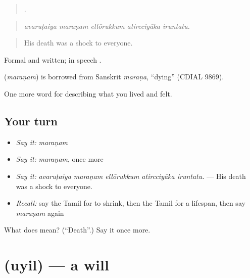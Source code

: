 \begin{quote}
    .
\end{quote}

\begin{quote}
\emph{avaruṭaiya maraṇam ellōrukkum atircciyāka iruntatu.}
\end{quote}

\begin{quote}
His death was a shock to everyone.
\end{quote}

Formal and written; in speech .

\begin{cousinweb}
\textbf{} (\emph{maraṇam}) is borrowed from Sanskrit \emph{maraṇa}, \textquotedblleft{}dying\textquotedblright{} (CDIAL 9869).
\end{cousinweb}

\begin{grammarlens}[title={What you've built}]
One more word for describing what you lived and felt.
\end{grammarlens}

\subsection*{Your turn}
\begin{itemize}
\raggedright
  \item \emph{Say it:} \emph{maraṇam}
  \item \emph{Say it:} \emph{maraṇam}, once more
  \item \emph{Say it:} \emph{avaruṭaiya maraṇam ellōrukkum atircciyāka iruntatu.} — His death was a shock to everyone.
  \item \emph{Recall:} say the Tamil for to shrink, then the Tamil for a lifespan, then say \emph{maraṇam} again
\end{itemize}

\begin{tcolorbox}[breakable,colback=teal!4,colframe=teal!35!black,title={Before you move on}]
What does  mean? (\textquotedblleft{}Death\textquotedblright{}.) Say it once more.
\end{tcolorbox}
\section[\texorpdfstring{\ta{உயில்} (uyil)}{உயில் (uyil)}]{ (uyil) — a will}

